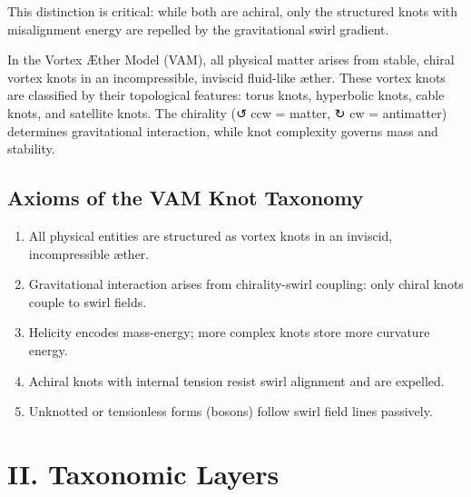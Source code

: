 \documentclass[12pt]{article}
\begin{document}
This distinction is critical: while both are achiral, only the structured knots with misalignment energy are repelled by the gravitational swirl gradient.

In the Vortex Æther Model (VAM), all physical matter arises from stable, chiral vortex knots in an incompressible, inviscid fluid-like æther. These vortex knots are classified by their topological features: torus knots, hyperbolic knots, cable knots, and satellite knots. The chirality (↺ ccw = matter, ↻ cw = antimatter) determines gravitational interaction, while knot complexity governs mass and stability.

\subsection*{Axioms of the VAM Knot Taxonomy}
\begin{enumerate}
    \item All physical entities are structured as vortex knots in an inviscid, incompressible æther.
    \item Gravitational interaction arises from chirality-swirl coupling: only chiral knots couple to swirl fields.
    \item Helicity encodes mass-energy; more complex knots store more curvature energy.
    \item Achiral knots with internal tension resist swirl alignment and are expelled.
    \item Unknotted or tensionless forms (bosons) follow swirl field lines passively.
\end{enumerate}

\begin{center}
\end{center}

\section*{II. Taxonomic Layers}
\end{document}
